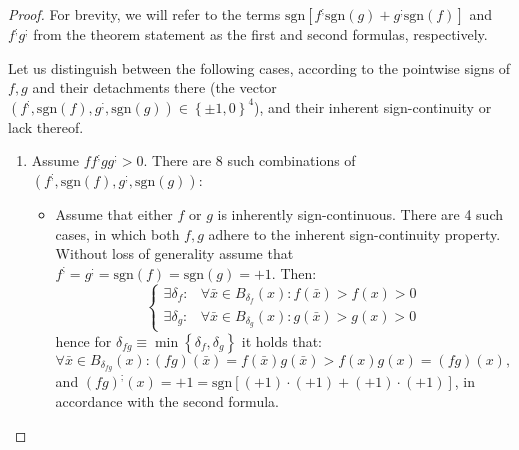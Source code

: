\documentclass[11pt]{book}
\begin{document}
\begin{proof}For brevity, we will refer to the terms $\text{sgn}\left[f^{;}\text{sgn}\left(g\right)+g^{;}\text{sgn}\left(f\right)\right]$ and $f^{;}g^{;}$ from the theorem statement as the first and second formulas, respectively.

Let us distinguish between the following cases, according to the pointwise signs of $f,g$ and their detachments there (the vector $\left(f^{;},\text{sgn}\left(f\right),g^{;},\text{sgn}\left(g\right)\right)\in\left\{ \pm1,0\right\} ^{4}$), and their inherent sign-continuity or lack thereof.

\begin{enumerate}

\item Assume $ff^{;}gg^{;}>0$. There are 8 such combinations of $\left(f^{;},\text{sgn}\left(f\right),g^{;},\text{sgn}\left(g\right)\right)$:

\begin{itemize}

\item
Assume that either $f$ or $g$ is inherently sign-continuous. There are 4 such cases, in which both $f,g$ adhere to the inherent sign-continuity property. Without loss of generality assume that $f^{;}=g^{;}=\text{sgn}\left(f\right)=\text{sgn}\left(g\right)=+1$. Then: $$\begin{cases} \exists\delta_{f}: & \forall\bar{x}\in B_{\delta_{f}}\left(x\right):f\left(\bar{x}\right)>f\left(x\right)>0\\ \exists\delta_{g}: & \forall\bar{x}\in B_{\delta_{g}}\left(x\right):g\left(\bar{x}\right)>g\left(x\right)>0 \end{cases}$$ hence for $\delta_{fg}\equiv\min\left\{ \delta_{f},\delta_{g}\right\}$ it holds that: $$\forall\bar{x}\in B_{\delta_{fg}}\left(x\right):\left(fg\right)\left(\bar{x}\right)=f\left(\bar{x}\right)g\left(\bar{x}\right)>f\left(x\right)g\left(x\right)=\left(fg\right)\left(x\right),$$ and  $\left(fg\right)^{;}\left(x\right)=+1=\text{sgn}\left[\left(+1\right)\cdot\left(+1\right)+\left(+1\right)\cdot\left(+1\right)\right]$, in accordance with the second formula.


\end{itemize}
\end{enumerate}
\end{proof}
\end{document}
